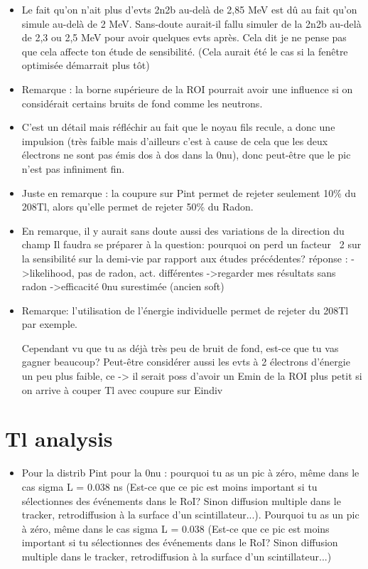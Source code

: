 \documentclass[a4paper,12pt, twoside]{memoir}   	%
\begin{document}
\begin{itemize}
               \item Le fait qu'on n'ait plus d'evts 2n2b au-delà de 2,85 MeV est dû au fait qu'on simule au-delà de 2 MeV. Sans-doute aurait-il fallu simuler de la 2n2b au-delà de 2,3 ou 2,5 MeV pour avoir quelques evts après. Cela dit je ne pense pas que cela affecte ton étude de sensibilité. (Cela aurait été le cas si la fenêtre optimisée démarrait plus tôt)
               \item Remarque : la borne supérieure de la ROI pourrait avoir une influence si on considérait certains bruits de fond comme les neutrons.
               \item C'est un détail mais réfléchir au fait que le noyau fils recule, a donc une impulsion (très faible mais d'ailleurs c'est à cause de cela que les deux électrons ne sont pas émis dos à dos dans la 0nu), donc peut-être que le pic n'est pas infiniment fin.
               \item Juste en remarque : la coupure sur Pint permet de rejeter seulement 10\% du 208Tl, alors qu'elle permet de rejeter 50\% du Radon.
               \item En remarque, il y aurait sans doute aussi des variations de la direction du champ
                 Il faudra se préparer à la question: pourquoi on perd un facteur ~2 sur la sensibilité sur la demi-vie par rapport aux études précédentes?
                 réponse :
                 ->likelihood, pas de radon, act. différentes
                 ->regarder mes résultats sans radon
                 ->efficacité 0nu surestimée (ancien soft)
                 \item Remarque: l'utilisation de l'énergie individuelle permet de rejeter du 208Tl par exemple.

Cependant vu que tu as déjà très peu de bruit de fond, est-ce que tu vas gagner beaucoup? Peut-être considérer aussi les evts à 2 électrons d'énergie un peu plus faible, ce -> il serait poss d'avoir un Emin de la ROI plus petit si on arrive à couper Tl avec coupure sur Eindiv
               \end{itemize}

               \chapter{Tl analysis}
               \begin{itemize}
               \item Pour la distrib Pint pour la 0nu : pourquoi tu as un pic à zéro, même dans le cas sigma L = 0.038 ns (Est-ce que ce pic est moins important si tu sélectionnes des événements dans le RoI? Sinon diffusion multiple dans le tracker, retrodiffusion à la surface d'un scintillateur...). Pourquoi tu as un pic à zéro, même dans le cas sigma L = 0.038 (Est-ce que ce pic est moins important si tu sélectionnes des événements dans le RoI? Sinon diffusion multiple dans le tracker, retrodiffusion à la surface d'un scintillateur...)
               \end{itemize}

               
\end{document}
